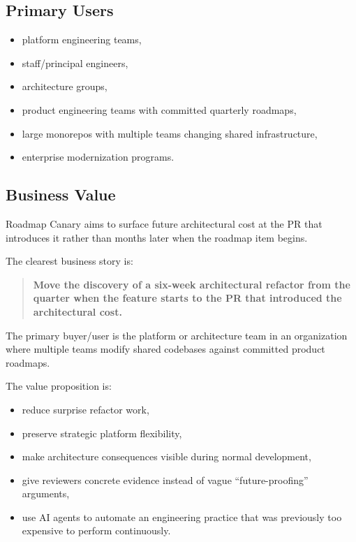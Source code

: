 \documentclass[12pt]{article}
\begin{document}
\subsection{Primary Users}

\begin{itemize}
    \item platform engineering teams,
    \item staff/principal engineers,
    \item architecture groups,
    \item product engineering teams with committed quarterly roadmaps,
    \item large monorepos with multiple teams changing shared infrastructure,
    \item enterprise modernization programs.
\end{itemize}

\subsection{Business Value}

Roadmap Canary aims to surface future architectural cost at the PR that introduces it rather than months later when the roadmap item begins.

The clearest business story is:

\begin{quote}
\textbf{Move the discovery of a six-week architectural refactor from the quarter when the feature starts to the PR that introduced the architectural cost.}
\end{quote}

The primary buyer/user is the platform or architecture team in an organization where multiple teams modify shared codebases against committed product roadmaps.

The value proposition is:

\begin{itemize}
    \item reduce surprise refactor work,
    \item preserve strategic platform flexibility,
    \item make architecture consequences visible during normal development,
    \item give reviewers concrete evidence instead of vague ``future-proofing'' arguments,
    \item use AI agents to automate an engineering practice that was previously too expensive to perform continuously.
\end{itemize}
\end{document}
